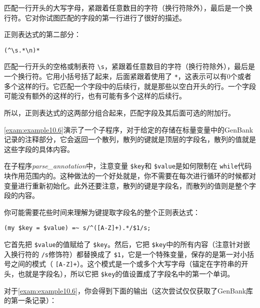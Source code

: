 匹配一行开头的大写字母，紧跟着任意数目的字符（换行符除外），最后是一个换行符。它对你试图匹配的字段的第一行进行了很好的描述。

正则表达式的第二部分：
  
\begin{lstlisting}
(^\s.*\n)*
\end{lstlisting}

匹配一行开头的空格或制表符 \verb|\s|，紧跟着任意数目的字符（换行符除外），最后是一个换行符。它用小括号括了起来，后面紧跟着使用了 \verb|*|，这表示可以有0个或者多个这样的行。它匹配一个字段中的后续行，就是那些以空白开头的行。一个字段可能没有额外的这样的行，也有可能有多个这样的后续行。

所以，正则表达式的这两部分组合起来，匹配字段及其后面可选的附加行。

\autoref{exam:example10.6}演示了一个子程序，对于给定的存储在标量变量中的GenBank记录的注释部分，它会返回一个散列，散列的键就是顶层的字段名，散列的值就是这些字段的具体内容。



在子程序\textit{parse\_annotation}中，注意变量 \verb|$key|和 \verb|$value|是如何限制在 \verb|while|代码块作用范围内的。这种做法的一个好处就是，你不需要在每次进行循环的时候都对变量进行重新初始化。此外还要注意，散列的键是字段名，而散列的值则是整个字段的内容。

你可能需要花些时间来理解为键提取字段名的整个正则表达式：

\begin{lstlisting}
(my $key = $value) =~ s/^([A-Z]+).*/$1/s;
\end{lstlisting}

它首先把 \verb|$value|的值赋给了 \verb|$key|。然后，它把 \verb|$key|中的所有内容（注意针对嵌入换行符的 \verb|/s|修饰符）都替换成了 \verb|$1|，它是一个特殊变量，保存的是第一对小括号之间的模式（ \verb|[A-Z]+|）。这个模式是一个或多个大写字母（锚定在字符串的开头，也就是字段名），所以它把 \verb|$key|的值设置成了字段名中的第一个单词。


对于\autoref{exam:example10.6}，你会得到下面的输出（这次尝试仅仅获取了GenBank库的第一条记录）：

